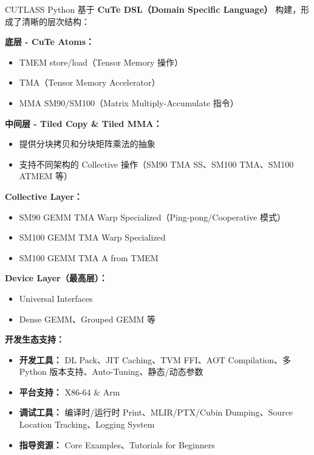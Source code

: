 CUTLASS Python 基于 \textbf{Cu\allowbreak{}Te DSL（Domain Specific Language）} 构建，形成了清晰的层次结构：

\textbf{底层 - Cu\allowbreak{}Te Atoms：}

\begin{itemize}
\item TMEM store/\allowbreak{}load（Tensor Memory 操作）
\item TMA（Tensor Memory Accelerator）
\item MMA SM90/\allowbreak{}SM100（Matrix Multiply-Accumulate 指令）
\end{itemize}

\textbf{中间层 - Tiled Copy \& Tiled MMA：}

\begin{itemize}
\item 提供分块拷贝和分块矩阵乘法的抽象
\item 支持不同架构的 Collective 操作（SM90 TMA SS、SM100 TMA、SM100 ATMEM 等）
\end{itemize}

\textbf{Collective Layer：}

\begin{itemize}
\item SM90 GEMM TMA Warp Specialized（Ping-pong/\allowbreak{}Cooperative 模式）
\item SM100 GEMM TMA Warp Specialized
\item SM100 GEMM TMA A from TMEM
\end{itemize}

\textbf{Device Layer（最高层）：}

\begin{itemize}
\item Universal Interfaces
\item Dense GEMM、Grouped GEMM 等
\end{itemize}

\textbf{开发生态支持：}

\begin{itemize}
\item \textbf{开发工具：} DL Pack、JIT Caching、TVM FFI、AOT Compilation、多 Python 版本支持、Auto-Tuning、静态/\allowbreak{}动态参数
\item \textbf{平台支持：} X86-64 \& Arm
\item \textbf{调试工具：} 编译时/\allowbreak{}运行时 Print、MLIR/\allowbreak{}PTX/\allowbreak{}Cubin Dumping、Source Location Tracking、Logging System
\item \textbf{指导资源：} Core Examples、Tutorials for Beginners
\end{itemize}

